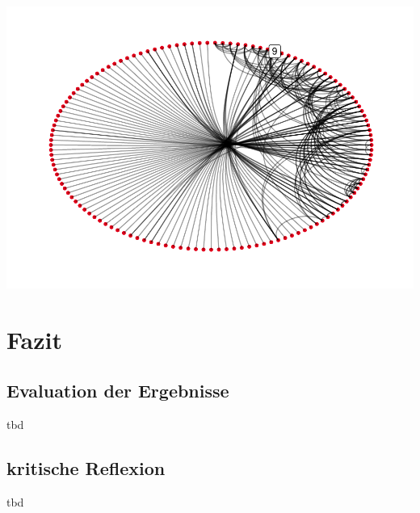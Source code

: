 \documentclass[
  12 pt,
]{article}
\begin{document}
\includegraphics{BUBECK_FERDINAND_SNA_Assignment_files/figure-latex/unnamed-chunk-4-1.pdf}

\newpage

\hypertarget{fazit}{%
\section{Fazit}\label{fazit}}

\hypertarget{evaluation-der-ergebnisse}{%
\subsection{Evaluation der Ergebnisse}\label{evaluation-der-ergebnisse}}

tbd

\hypertarget{kritische-reflexion}{%
\subsection{kritische Reflexion}\label{kritische-reflexion}}

tbd
\end{document}
